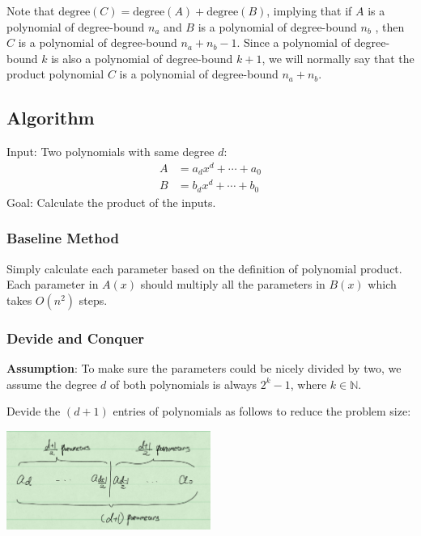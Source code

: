 \documentclass[en,hazy,blue,screen,14pt]{elegantnote}
\begin{document}
Note that $\text{degree}(C) = \text{degree}(A) +  \text{degree}(B)$, implying 
that if $A$ is a polynomial of degree-bound $n_a$ and $B$ is a polynomial 
of degree-bound $n_b$ , then $C$ is a polynomial of degree-bound $n_a + n_b - 
1$. Since a polynomial of degree-bound $k$ is also a polynomial of degree-bound 
$k + 1$, we will normally say that the product polynomial $C$ is a polynomial 
of degree-bound $n_a + n_b$.

\subsection{Algorithm}
Input: Two polynomials with same degree $d$:
\begin{align*}
 A &= a_d x^d + \cdots + a_0\\
 B &= b_d x^d + \cdots + b_0
\end{align*}
Goal: Calculate the product of the inputs.

\subsubsection{Baseline Method}
Simply calculate each parameter based on the definition of polynomial product. 
Each parameter in $A(x)$ should multiply all the parameters in $B(x)$ 
which takes $O(n^2)$ steps.
\subsubsection{Devide and Conquer}
\textbf{Assumption}: To make sure the parameters could be nicely divided by 
two, we assume the degree $d$ of both polynomials is always $2^k - 1$, where $k 
\in \mathbb{N}$.

Devide the $(d+1)$ entries of polynomials as follows to reduce the problem size:

\centerline{\includegraphics[width=0.5\textwidth]{poly-devide.png}}
\end{document}
